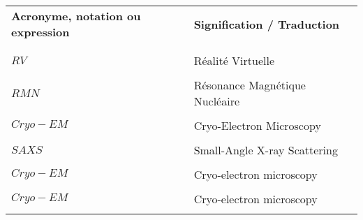 

\begin{table}[htbp]
\centering
\begin{tabular}{l l l}

\textbf{Acronyme, notation ou expression} & \textbf{Signification / Traduction} & \\ \\ %
\hline
\\
$RV$ & Réalité Virtuelle & \\  \\
$RMN$ & Résonance Magnétique Nucléaire & \\  \\
$Cryo-EM$ & Cryo-Electron Microscopy & \\  \\
$SAXS$ & Small-Angle X-ray Scattering & \\  \\
$Cryo-EM$ & Cryo-electron microscopy & \\  \\
$Cryo-EM$ & Cryo-electron microscopy & \\  \\

\end{tabular}
\end{table}
